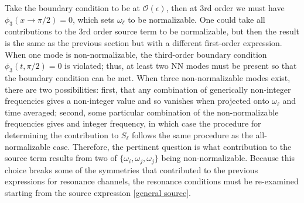 \documentclass[letterpaper,11pt]{article}
\newcommand{\oi}{\omega_i}
\newcommand{\oj}{\omega_j}
\newcommand{\mc}{\mathcal}
\begin{document}
Take the boundary condition to be at $\mc O(\epsilon)$, then at 3rd order we must have $\phi_3 (x \to \pi/2) = 0$, which sets $\omega_\ell$ to be normalizable. One could take all contributions to the 3rd order source term to be normalizable, but then the result is the same as the previous section but with a different first-order expression. When one mode is non-normalizable, the third-order boundary condition $\phi_3 (t, \pi/2) = 0$ is violated; thus, at least two NN modes must be present so that the boundary condition can be met. When three non-normalizable modes exist, there are two possibilities: first, that any combination of generically non-integer frequencies gives a non-integer value and so vanishes when projected onto $\omega_\ell$ and time averaged; second, some particular combination of the non-normalizable frequencies gives and integer frequency, in which case the procedure for determining the contribution to $S_\ell$ follows the same procedure as the all-normalizable case. Therefore, the pertinent question is what contribution to the source term results from two of $\{\oi, \oj, \oj\}$ being non-normalizable. Because this choice breaks some of the symmetries that contributed to the previous expressions for resonance channels, the resonance conditions must be re-examined starting from the source expression \eqref{general source}.
\end{document}

